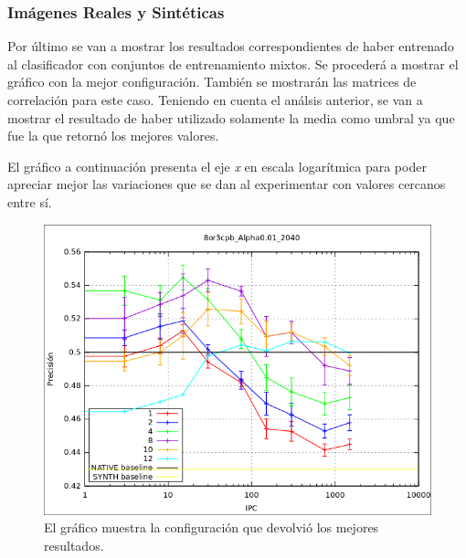 \newpage
    	\subsubsection{Imágenes Reales y Sintéticas}
    	
	Por último se van a mostrar los resultados correspondientes de haber entrenado al clasificador con conjuntos de entrenamiento mixtos. Se procederá a mostrar el gráfico con la mejor configuración. También se mostrarán las matrices de correlación para este caso. Teniendo en cuenta el análsis anterior, se van a mostrar el resultado de haber utilizado solamente la media como umbral ya que fue la que retornó los mejores valores.
	
	El gráfico a continuación presenta el eje \textit{x} en escala logarítmica para poder apreciar mejor las variaciones que se dan al experimentar con valores cercanos entre sí.
	
			\begin{figure}[!htbp]
				\centering
				\centerline{
					\includegraphics[scale=0.6]{img/resultados/mixtas/best_mean_2040.png}
				}
				\caption[Mixtas media mejor resultado]{El gráfico muestra la configuración que devolvió los mejores resultados.}
				\label{fig: Mixtas-media-mejor}
			\end{figure}

